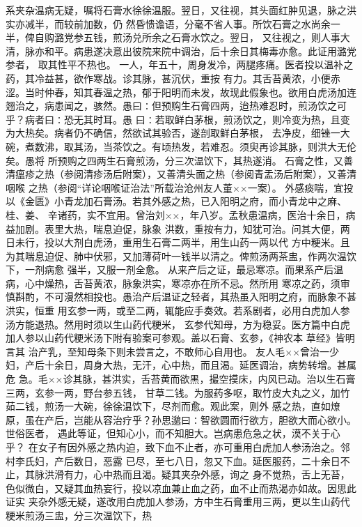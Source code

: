 \documentclass[a4paper,12pt,UTF8,twoside]{ctexbook}
\begin{document}
系夹杂温病无疑，嘱将石膏水徐徐温服。翌日，又往视，其头面红肿见退，脉之洪实亦减半，而较前加数，仍 
然昏愦谵语，分毫不省人事。所饮石膏之水尚余一半，俾自购潞党参五钱，煎汤兑所余之石膏水饮之。翌日， 
又往视之，则人事大清，脉亦和平。病患遂决意出彼院来院中调治，后十余日其梅毒亦愈。此证用潞党参者， 
取其性平不热也。 
一人，年五十，周身发冷，两腿疼痛。医者投以温补之药，其冷益甚，欲作寒战。诊其脉，甚沉伏，重按 
有力。其舌苔黄浓，小便赤涩。当时仲春，知其春温之热，郁于阳明而未发，故现此假象也。欲用白虎汤加连 
翘治之，病患闻之，骇然。愚曰∶但预购生石膏四两，迨热难忍时，煎汤饮之可乎？病者曰∶恐无其时耳。愚 
曰∶若取鲜白茅根，煎汤饮之，则冷变为热，且变为大热矣。病者仍不确信，然欲试其验否，遂剖取鲜白茅根， 
去净皮，细锉一大碗，煮数沸，取其汤，当茶饮之。有顷热发，若难忍。须臾再诊其脉，则洪大无伦矣。愚将 
所预购之四两生石膏煎汤，分三次温饮下，其热遂消。 
石膏之性，又善清瘟疹之热（参阅清疹汤后附案），又善清头面之热（参阅青盂汤后附案），又善清咽喉 
之热（参阅“详论咽喉证治法”所载治沧州友人董××一案）。 
外感痰喘，宜投以《金匮》小青龙加石膏汤。若其外感之热，已入阳明之府，而小青龙中之麻、桂、姜、 
辛诸药，实不宜用。曾治刘××，年八岁。孟秋患温病，医治十余日，病益加剧。表里大热，喘息迫促，脉象 
洪数，重按有力，知犹可治。问其大便，两日未行，投以大剂白虎汤，重用生石膏二两半，用生山药一两以代 
方中粳米。且为其喘息迫促、肺中伏邪，又加薄荷叶一钱半以清之。俾煎汤两茶盅，作两次温饮下，一剂病愈 
强半，又服一剂全愈。 
从来产后之证，最忌寒凉。而果系产后温病，心中燥热，舌苔黄浓，脉象洪实，寒凉亦在所不忌。然所用 
寒凉之药，须审慎斟酌，不可漫然相投也。愚治产后温证之轻者，其热虽入阳明之府，而脉象不甚洪实，恒重 
用玄参一两，或至二两，辄能应手奏效。若系剧者，必用白虎加人参汤方能退热。然用时须以生山药代粳米， 
玄参代知母，方为稳妥。医方篇中白虎加人参以山药代粳米汤下附有验案可参观。盖以石膏、玄参，《神农本 
草经》皆明言其 
治产乳，至知母条下则未尝言之，不敢师心自用也。 
友人毛××曾治一少妇，产后十余日，周身大热，无汗，心中热，而且渴。延医调治，病势转增。甚属危 
急。毛××诊其脉，甚洪实，舌苔黄而欲黑，撮空摸床，内风已动。治以生石膏三两，玄参一两，野台参五钱， 
甘草二钱。为服药多呕，取竹皮大丸之义，加竹茹二钱，煎汤一大碗，徐徐温饮下，尽剂而愈。观此案，则外 
感之热，直如燎原，虽在产后，岂能从容治疗乎？孙思邈曰∶智欲圆而行欲方，胆欲大而心欲小。世俗医者， 
遇此等证，但知心小，而不知胆大。岂病患危急之状，漠不关于心乎？ 
在女子有因外感之热内迫，致下血不止者，亦可重用白虎加人参汤治之。邻村李氏妇，产后数日，恶露 
已尽，至七八日，忽又下血。延医服药，二十余日不止，其脉洪滑有力，心中热而且渴。疑其夹杂外感，询之 
身不觉热，舌上无苔，色似微白，又疑其血热妄行，投以凉血兼止血之药，血不止而热渴亦如故。因思此证实 
夹杂外感无疑，遂改用白虎加人参汤，方中生石膏重用三两，更以生山药代粳米煎汤三盅，分三次温饮下，热 
\end{document}
